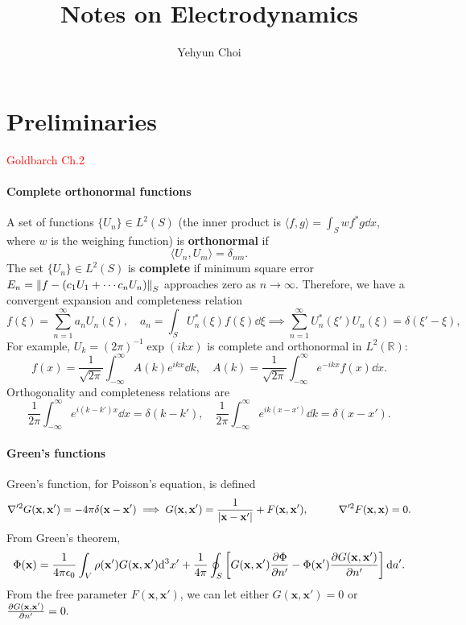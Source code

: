 \documentclass{article}
\title{Notes on Electrodynamics}
\author{Yehyun Choi}
\begin{document}
\maketitle

\pagebreak

\section{Preliminaries}
\textcolor{red}{Goldbarch Ch.2}
\paragraph{Complete orthonormal functions}
A set of functions $\{U_n\}\in L^2(S)$ (the inner product is $\langle f,g\rangle=\int_Swf^*g\dd x$, where $w$ is the weighing function) is \textbf{orthonormal} if 
$$\langle U_n,U_m\rangle=\delta_{nm}.$$
The set $\{U_n\}\in L^2(S)$ is \textbf{complete} if minimum square error $E_n=\left\lVert f-(c_1U_1+\cdots c_nU_n)\right\rVert_S$ approaches zero as $n\to\infty$. Therefore, we have a convergent expansion and completeness relation
$$f(\xi)=\sum^\infty_{n=1}a_nU_n(\xi),\quad a_n=\int_SU^*_n(\xi)f(\xi)\dd\xi\implies \sum^\infty_{n=1}U^*_n(\xi')U_n(\xi)=\delta(\xi'-\xi),$$
For example, $U_k=(2\pi)^{-1}\exp(ikx)$ is complete and orthonormal in $L^2(\mathbb R)$:
$$f(x)=\frac 1{\sqrt{2\pi}}\int^\infty_{-\infty}A(k)e^{ikx}\dd k,\quad A(k)=\frac 1{\sqrt{2\pi}}\int^\infty_{-\infty}e^{-ikx}f(x)\dd x.$$
Orthogonality and completeness relations are 
$$\frac 1{2\pi}\int^\infty_{-\infty}e^{i(k-k')x}\dd x=\delta(k-k'),\quad \frac 1{2\pi}\int^\infty_{-\infty}e^{ik(x-x')}\dd k=\delta(x-x').$$



\paragraph{Green's functions}
Green's function, for Poisson's equation, is defined 
$$\nabla'^2G(\mathbf x,\mathbf x')=-4\pi\delta(\mathbf x-\mathbf x')\implies G(\mathbf x,\mathbf x')=\frac 1{\abs{\mathbf x-\mathbf x'}}+F(\mathbf x,\mathbf x'),\hspace{10mm}\nabla'^2F(\mathbf x,\mathbf x)=0.$$
From Green's theorem, 
$$\Phi(\mathbf x)=\frac 1{4\pi\epsilon_0}\int_V\rho(\mathbf x')G(\mathbf x,\mathbf x')\dd^3x'+\frac 1{4\pi}\oint_S\left[G(\mathbf x,\mathbf x') \frac{\partial \Phi}{\partial n'}-\Phi(\mathbf x') \frac{\partial G(\mathbf x,\mathbf x')}{\partial n'}\right]\dd a'.$$
From the free parameter $F(\mathbf x,\mathbf x')$, we can let either $G(\mathbf x,\mathbf x')=0$ or $ \frac{\partial G(\mathbf x,\mathbf x')}{\partial n'}=0.$ 
\end{document}

